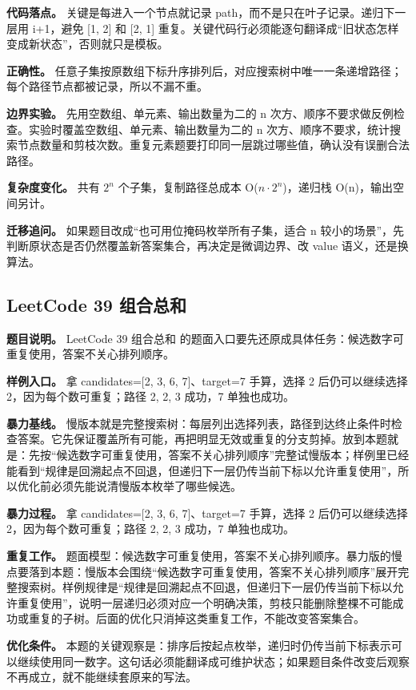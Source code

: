 \textbf{代码落点。} 关键是每进入一个节点就记录 path，而不是只在叶子记录。递归下一层用 i+1，避免 [1, 2] 和 [2, 1] 重复。关键代码行必须能逐句翻译成“旧状态怎样变成新状态”，否则就只是模板。

\textbf{正确性。} 任意子集按原数组下标升序排列后，对应搜索树中唯一一条递增路径；每个路径节点都被记录，所以不漏不重。

\textbf{边界实验。} 先用空数组、单元素、输出数量为二的 n 次方、顺序不要求做反例检查。实验时覆盖空数组、单元素、输出数量为二的 n 次方、顺序不要求，统计搜索节点数量和剪枝次数。重复元素题要打印同一层跳过哪些值，确认没有误删合法路径。

\textbf{复杂度变化。} 共有 \ensuremath{2^{n}} 个子集，复制路径总成本 O(\ensuremath{n \cdot 2^{n}})，递归栈 O(n)，输出空间另计。

\textbf{迁移追问。} 如果题目改成“也可用位掩码枚举所有子集，适合 n 较小的场景”，先判断原状态是否仍然覆盖新答案集合，再决定是微调边界、改 value 语义，还是换算法。

\subsection{LeetCode 39 组合总和}

\textbf{题目说明。} LeetCode 39 组合总和 的题面入口要先还原成具体任务：候选数字可重复使用，答案不关心排列顺序。

\textbf{样例入口。} 拿 candidates=[2, 3, 6, 7]、target=7 手算，选择 2 后仍可以继续选择 2，因为每个数可重复；路径 2, 2, 3 成功，7 单独也成功。

\textbf{暴力基线。} 慢版本就是完整搜索树：每层列出选择列表，路径到达终止条件时检查答案。它先保证覆盖所有可能，再把明显无效或重复的分支剪掉。放到本题就是：先按“候选数字可重复使用，答案不关心排列顺序”完整试慢版本；样例里已经能看到“规律是回溯起点不回退，但递归下一层仍传当前下标以允许重复使用”，所以优化前必须先能说清慢版本枚举了哪些候选。

\textbf{暴力过程。} 拿 candidates=[2, 3, 6, 7]、target=7 手算，选择 2 后仍可以继续选择 2，因为每个数可重复；路径 2, 2, 3 成功，7 单独也成功。

\textbf{重复工作。} 题面模型：候选数字可重复使用，答案不关心排列顺序。暴力版的慢点要落到本题：慢版本会围绕“候选数字可重复使用，答案不关心排列顺序”展开完整搜索树。样例规律是“规律是回溯起点不回退，但递归下一层仍传当前下标以允许重复使用”，说明一层递归必须对应一个明确决策，剪枝只能删除整棵不可能成功或重复的子树。后面的优化只消掉这类重复工作，不能改变答案集合。

\textbf{优化条件。} 本题的关键观察是：排序后按起点枚举，递归时仍传当前下标表示可以继续使用同一数字。这句话必须能翻译成可维护状态；如果题目条件改变后观察不再成立，就不能继续套原来的写法。

